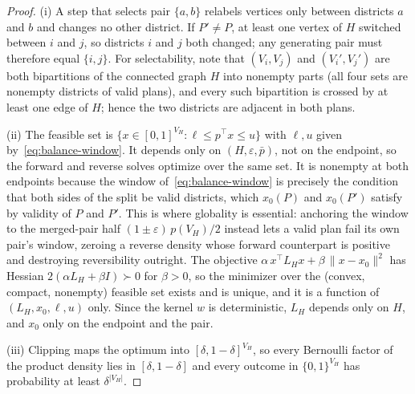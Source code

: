 \documentclass[11pt]{article}
\begin{document}
\begin{proof}
(i) A step that selects pair $\{a,b\}$ relabels vertices only
between districts $a$ and $b$ and changes no other district. If
$P' \ne P$, at least one vertex of $H$ switched between $i$ and $j$,
so districts $i$ and $j$ both changed; any generating pair must
therefore equal $\{i,j\}$. For selectability, note that
$(V_i, V_j)$ and $(V_i', V_j')$ are both bipartitions of the
connected graph $H$ into nonempty parts (all four sets are nonempty
districts of valid plans), and every such bipartition is crossed by
at least one edge of $H$; hence the two districts are adjacent in
both plans.

(ii) The feasible set is $\{x \in [0,1]^{V_H} : \ell \le p^\top x
\le u\}$ with $\ell, u$ given by~\eqref{eq:balance-window}. It
depends only on $(H, \varepsilon, \bar{p})$, not on the endpoint, so
the forward and reverse solves optimize over the same set. It is
nonempty at both endpoints because the window
of~\eqref{eq:balance-window} is precisely the condition that both
sides of the split be valid districts, which $x_0(P)$ and $x_0(P')$
satisfy by validity of $P$ and $P'$. This is where globality is
essential: anchoring the window to the merged-pair half
$(1 \pm \varepsilon)\,p(V_H)/2$ instead lets a valid plan fail its
own pair's window, zeroing a reverse density whose forward
counterpart is positive and destroying reversibility outright. The
objective $\alpha\, x^\top L_H x + \beta\, \|x - x_0\|^2$ has Hessian
$2(\alpha L_H + \beta I) \succ 0$ for $\beta > 0$, so the minimizer
over the (convex, compact, nonempty) feasible set exists and is
unique, and it is a function of $(L_H, x_0, \ell, u)$ only. Since
the kernel $w$ is deterministic, $L_H$ depends only on $H$, and
$x_0$ only on the endpoint and the pair.

(iii) Clipping maps the optimum into $[\delta, 1-\delta]^{V_H}$, so
every Bernoulli factor of the product density lies in
$[\delta, 1-\delta]$ and every outcome in $\{0,1\}^{V_H}$ has
probability at least $\delta^{|V_H|}$.
\end{proof}
\end{document}
